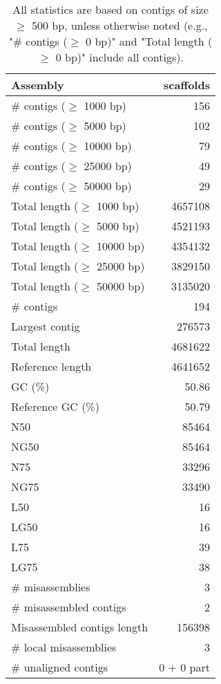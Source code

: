 \documentclass[12pt,a4paper]{article}
\begin{document}
\begin{table}[ht]
\begin{center}
\caption{All statistics are based on contigs of size $\geq$ 500 bp, unless otherwise noted (e.g., "\# contigs ($\geq$ 0 bp)" and "Total length ($\geq$ 0 bp)" include all contigs).}
\begin{tabular}{|l*{1}{|r}|}
\hline
Assembly & scaffolds \\ \hline
\# contigs ($\geq$ 1000 bp) & 156 \\ \hline
\# contigs ($\geq$ 5000 bp) & 102 \\ \hline
\# contigs ($\geq$ 10000 bp) & 79 \\ \hline
\# contigs ($\geq$ 25000 bp) & 49 \\ \hline
\# contigs ($\geq$ 50000 bp) & 29 \\ \hline
Total length ($\geq$ 1000 bp) & 4657108 \\ \hline
Total length ($\geq$ 5000 bp) & 4521193 \\ \hline
Total length ($\geq$ 10000 bp) & 4354132 \\ \hline
Total length ($\geq$ 25000 bp) & 3829150 \\ \hline
Total length ($\geq$ 50000 bp) & 3135020 \\ \hline
\# contigs & 194 \\ \hline
Largest contig & 276573 \\ \hline
Total length & 4681622 \\ \hline
Reference length & 4641652 \\ \hline
GC (\%) & 50.86 \\ \hline
Reference GC (\%) & 50.79 \\ \hline
N50 & 85464 \\ \hline
NG50 & 85464 \\ \hline
N75 & 33296 \\ \hline
NG75 & 33490 \\ \hline
L50 & 16 \\ \hline
LG50 & 16 \\ \hline
L75 & 39 \\ \hline
LG75 & 38 \\ \hline
\# misassemblies & 3 \\ \hline
\# misassembled contigs & 2 \\ \hline
Misassembled contigs length & 156398 \\ \hline
\# local misassemblies & 3 \\ \hline
\# unaligned contigs & 0 + 0 part \\ \hline

\end{tabular}
\end{center}
\end{table}
\end{document}
